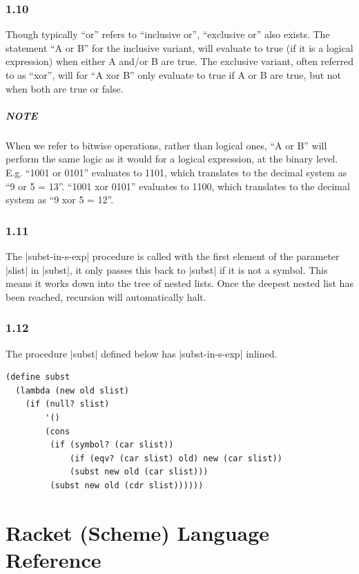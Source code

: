 \documentclass[a4paper]{article}
\begin{document}
\subsubsection*{1.10}

Though typically ``or'' refers to ``inclusive or'', ``exclusive or'' also exists. The statement ``A or B'' for the inclusive variant, will evaluate to true (if it is a logical expression) when either A and/or B are true. The exclusive variant, often referred to as ``xor'', will for ``A xor B'' only evaluate to true if A or B are true, but not when both are true or false.

\subparagraph{NOTE} When we refer to bitwise operations, rather than logical ones, ``A or B'' will perform the same logic as it would for a logical expression, at the binary level. E.g. ``1001 or 0101'' evaluates to 1101, which translates to the decimal system as ``9 or 5 = 13''. ``1001 xor 0101'' evaluates to 1100, which translates to the decimal system as ``9 xor 5 = 12''.

\subsubsection*{1.11}

The |subst-in-s-exp| procedure is called with the first element of the parameter |slist| in |subst|, it only passes this back to |subst| if it is not a symbol. This means it works down into the tree of nested lists. Once the deepest nested list has been reached, recursion will automatically halt.

\subsubsection*{1.12}

The procedure |subst| defined below has |subst-in-s-exp| inlined.

\begin{lstlisting}
(define subst
  (lambda (new old slist)
    (if (null? slist)
        '()
        (cons
         (if (symbol? (car slist))
             (if (eqv? (car slist) old) new (car slist))
             (subst new old (car slist)))
         (subst new old (cdr slist))))))
\end{lstlisting}

\newpage

\section{Racket (Scheme) Language Reference}
\end{document}
